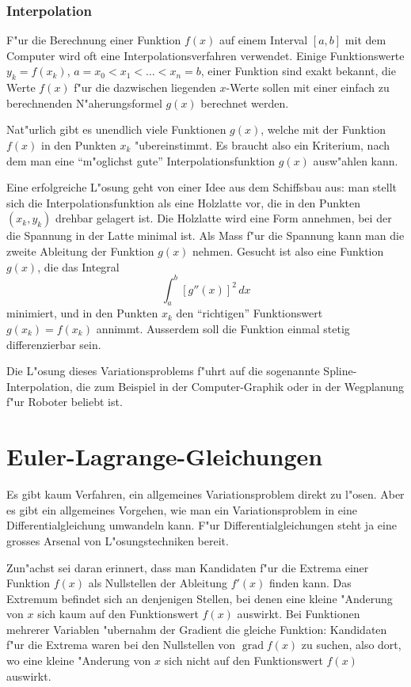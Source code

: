 \subsubsection{Interpolation}
F"ur die Berechnung einer Funktion $f(x)$ auf einem Interval
$[a,b]$ mit dem Computer wird oft eine Interpolationsverfahren verwendet.
Einige Funktionswerte $y_k=f(x_k)$, $a=x_0<x_1<\dots <x_n = b$,
einer Funktion sind exakt bekannt,
die Werte $f(x)$ f"ur die dazwischen liegenden $x$-Werte sollen
mit einer einfach zu berechnenden N"aherungsformel $g(x)$ berechnet
werden. 

Nat"urlich gibt es unendlich viele Funktionen $g(x)$, welche mit der
Funktion $f(x)$ in den Punkten $x_k$ "ubereinstimmt.
Es braucht also ein Kriterium, nach dem man eine ``m"oglichst gute''
Interpolationsfunktion $g(x)$ ausw"ahlen kann.

Eine erfolgreiche L"osung geht von einer Idee aus dem Schiffsbau aus:
man stellt sich die Interpolationsfunktion als eine Holzlatte vor, die
in den Punkten $(x_k,y_k)$ drehbar gelagert ist. Die Holzlatte wird
eine Form annehmen, bei der die Spannung in der Latte minimal ist.
Als Mass f"ur die Spannung kann man die zweite Ableitung der Funktion $g(x)$
nehmen. Gesucht ist also eine Funktion $g(x)$, die das Integral
\[
\int_a^b [g''(x)]^2\,dx
\]
minimiert, und in den Punkten $x_k$ den ``richtigen'' Funktionswert 
$g(x_k)=f(x_k)$ annimmt. Ausserdem soll die Funktion einmal stetig 
differenzierbar sein.

Die L"osung dieses Variationsproblems f"uhrt auf die sogenannte
Spline-Interpolation, die zum Beispiel in der Computer-Graphik oder
in der Wegplanung f"ur Roboter beliebt ist.

\section{Euler-Lagrange-Gleichungen}
Es gibt kaum Verfahren, ein allgemeines Variationsproblem direkt zu l"osen.
Aber es gibt ein allgemeines Vorgehen, wie man ein Variationsproblem
in eine Differentialgleichung umwandeln kann. F"ur Differentialgleichungen
steht ja eine grosses Arsenal von L"osungstechniken bereit.

Zun"achst sei daran erinnert, dass man Kandidaten f"ur die Extrema einer
Funktion $f(x)$ als Nullstellen der Ableitung $f'(x)$ finden kann.
Das Extremum befindet sich an denjenigen Stellen, bei denen 
eine kleine "Anderung von $x$ sich kaum auf den Funktionswert
$f(x)$ auswirkt.
Bei Funktionen mehrerer Variablen "ubernahm der Gradient die gleiche
Funktion: Kandidaten f"ur die Extrema waren bei den Nullstellen
von $\operatorname{grad}f(x)$ zu suchen, also dort, wo eine kleine
"Anderung von $x$ sich nicht auf den Funktionswert $f(x)$ auswirkt.

